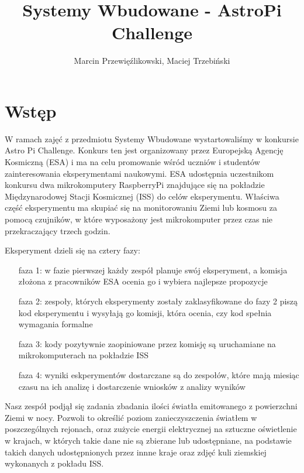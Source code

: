 \documentclass[12pt, a4paper]{report}
\title{Systemy Wbudowane - AstroPi Challenge}
\author{Marcin Przewięźlikowski, Maciej Trzebiński}
\begin{document}
    \maketitle

    \tableofcontents{}

    \chapter{Wstęp}\label{ch:introduction}

    W ramach zajęć z przedmiotu Systemy Wbudowane wystartowaliśmy w konkursie Astro Pi
    Challenge. Konkurs ten jest organizowany przez Europejską Agencję Kosmiczną (ESA) i ma na celu
    promowanie wśród uczniów i studentów zainteresowania eksperymentami naukowymi. ESA udostępnia
    uczestnikom konkursu dwa mikrokomputery RaspberryPi znajdujące się na pokładzie Międzynarodowej
    Stacji Kosmicznej (ISS) do celów eksperymentu. Właściwa część eksperymentu ma skupiać się na
    monitorowaniu Ziemi lub kosmosu za pomocą czujników, w które wyposażony jest mikrokomputer przez
    czas nie przekraczający trzech godzin.

    Eksperyment dzieli się na cztery fazy:
    \begin{itemize}
        \item[faza 1:] w fazie pierwszej każdy zespół planuje swój eksperyment, a komisja złożona z pracowników
        ESA ocenia go i wybiera najlepsze propozycje
        \item[faza 2:] zespoły, których eksperymenty zostały zaklasyfikowane do fazy 2 piszą kod eksperymentu
        i wysyłają go komisji, która ocenia, czy kod spełnia wymagania formalne
        \item[faza 3:] kody pozytywnie zaopiniowane przez komisję są uruchamiane na mikrokomputerach na pokładzie
        ISS
        \item[faza 4:] wyniki eskperymentów dostarczane są do zespołów, które mają miesiąc czasu na ich analizę i
        dostarczenie wniosków z analizy wyników
    \end{itemize}

    Nasz zespół podjął się zadania zbadania ilości światła emitowanego z powierzchni Ziemi w nocy.
    Pozwoli to określić poziom zanieczyszczenia światłem w poszczególnych rejonach, oraz zużycie energii
    elektrycznej na sztuczne oświetlenie w krajach, w których takie dane nie są zbierane lub udostępniane,
    na podstawie takich danych udostępnionych przez innne kraje oraz zdjęć kuli ziemskiej wykonanych z pokładu ISS.
\end{document}
